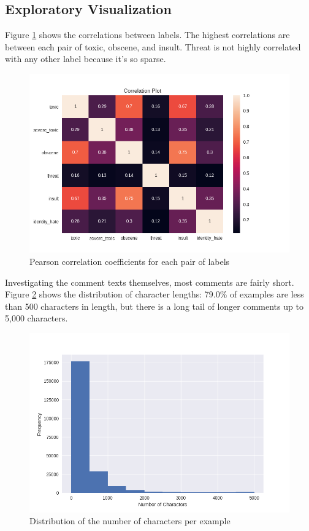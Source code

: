 \documentclass[12pt]{article}
\begin{document}
\subsection*{Exploratory Visualization}
\label{sec:orgbc972b1}

Figure \ref{fig:label-corr} shows the correlations between labels. The highest correlations are between each pair of toxic, obscene, and insult. Threat is not highly correlated with any other label because it's so sparse.

\begin{figure}
\centering
\includegraphics[width=\textwidth]{label_correlations}
\caption{Pearson correlation coefficients for each pair of labels}
\label{fig:label-corr}
\end{figure}

Investigating the comment texts themselves, most comments are fairly short. Figure \ref{fig:character-dist} shows the distribution of character lengths: 79.0\% of examples are less than 500 characters in length, but there is a long tail of longer comments up to 5,000 characters.

\begin{figure}
\centering
\includegraphics[width=\textwidth]{character_lengths}
\caption{Distribution of the number of characters per example}
\label{fig:character-dist}
\end{figure}
\end{document}

